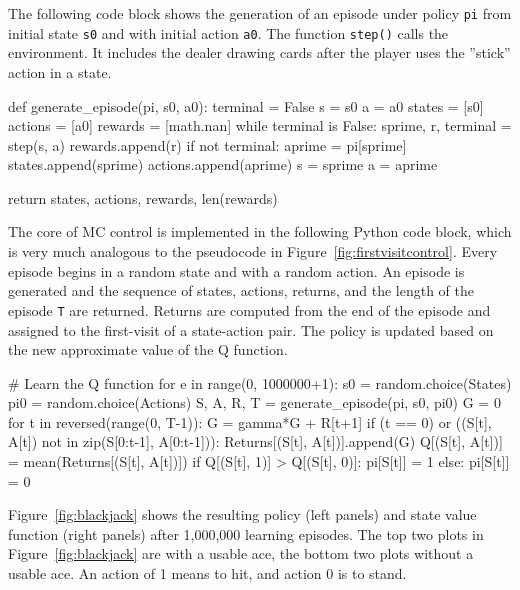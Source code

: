 The following code block shows the generation of an episode under policy \texttt{pi} from initial state \texttt{s0} and with initial action \texttt{a0}. The function \texttt{step()} calls the environment. It includes the dealer drawing cards after the player uses the ''stick'' action in a state. 

\begin{samepage}
\begin{pythoncode}
def generate_episode(pi, s0, a0):
    terminal = False
    s = s0
    a = a0
    states = [s0]
    actions = [a0]
    rewards = [math.nan]
    while terminal is False:
        sprime, r, terminal = step(s, a)
        rewards.append(r)
        if not terminal:
            aprime = pi[sprime]
            states.append(sprime)
            actions.append(aprime)
            s = sprime
            a = aprime

    return states, actions, rewards, len(rewards)
\end{pythoncode}
\end{samepage}

The core of MC control is implemented in the following Python code block, which is very much analogous to the pseudocode in Figure~\ref{fig:firstvisitcontrol}. Every episode begins in a random state and with a random action. An episode is generated and the sequence of states, actions, returns, and the length of the episode \texttt{T} are returned. Returns are computed from the end of the episode and assigned to the first-visit of a state-action pair. The policy is updated based on the new approximate value of the Q function.

\begin{pythoncode}
# Learn the Q function
for e in range(0, 1000000+1):
    s0 = random.choice(States)
    pi0 = random.choice(Actions)
    S, A, R, T = generate_episode(pi, s0, pi0)
    G = 0
    for t in reversed(range(0, T-1)):
        G = gamma*G + R[t+1]
        if (t == 0) or ((S[t], A[t]) not in zip(S[0:t-1], A[0:t-1])):
            Returns[(S[t], A[t])].append(G)
            Q[(S[t], A[t])] = mean(Returns[(S[t], A[t])])
            if Q[(S[t], 1)] > Q[(S[t], 0)]:
                pi[S[t]] = 1
            else:
                pi[S[t]] = 0
\end{pythoncode}

Figure~\ref{fig:blackjack} shows the resulting policy (left panels) and state value function (right panels) after 1,000,000 learning episodes. The top two plots in Figure~\ref{fig:blackjack} are with a usable ace, the bottom two plots without a usable ace. An action of 1 means to hit, and action 0 is to stand. 

